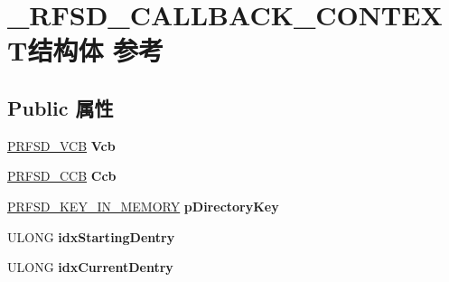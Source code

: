 \hypertarget{struct___r_f_s_d___c_a_l_l_b_a_c_k___c_o_n_t_e_x_t}{}\section{\+\_\+\+R\+F\+S\+D\+\_\+\+C\+A\+L\+L\+B\+A\+C\+K\+\_\+\+C\+O\+N\+T\+E\+X\+T结构体 参考}
\label{struct___r_f_s_d___c_a_l_l_b_a_c_k___c_o_n_t_e_x_t}
\subsection*{Public 属性}
\begin{DoxyCompactItemize}
\item 
\mbox{\label{struct___r_f_s_d___c_a_l_l_b_a_c_k___c_o_n_t_e_x_t_affbced2176a4b6e37f5de922d7170e98}} 
\hyperlink{struct___r_f_s_d___v_c_b}{P\+R\+F\+S\+D\+\_\+\+V\+CB} {\bfseries Vcb}
\item 
\mbox{\label{struct___r_f_s_d___c_a_l_l_b_a_c_k___c_o_n_t_e_x_t_a02815a1bf67a2d52ba544940c2aebec3}} 
\hyperlink{struct___r_f_s_d___c_c_b}{P\+R\+F\+S\+D\+\_\+\+C\+CB} {\bfseries Ccb}
\item 
\mbox{\label{struct___r_f_s_d___c_a_l_l_b_a_c_k___c_o_n_t_e_x_t_ac56c6773ba62aaf0829bc97f8e4143fd}} 
\hyperlink{structreiserfs__cpu__key}{P\+R\+F\+S\+D\+\_\+\+K\+E\+Y\+\_\+\+I\+N\+\_\+\+M\+E\+M\+O\+RY} {\bfseries p\+Directory\+Key}
\item 
\mbox{\label{struct___r_f_s_d___c_a_l_l_b_a_c_k___c_o_n_t_e_x_t_a5dbefb965ebf97604328ab56d5d9d174}} 
U\+L\+O\+NG {\bfseries idx\+Starting\+Dentry}
\item 
\mbox{\label{struct___r_f_s_d___c_a_l_l_b_a_c_k___c_o_n_t_e_x_t_a2b052ad8a34b6e70fff645466681a2ac}} 
U\+L\+O\+NG {\bfseries idx\+Current\+Dentry}
\item 
\mbox{\label{struct___r_f_s_d___c_a_l_l_b_a_c_k___c_o_n_t_e_x_t_a73c142e53d0dfaaa97f38d6460354c05}} 

\end{DoxyCompactItemize}
